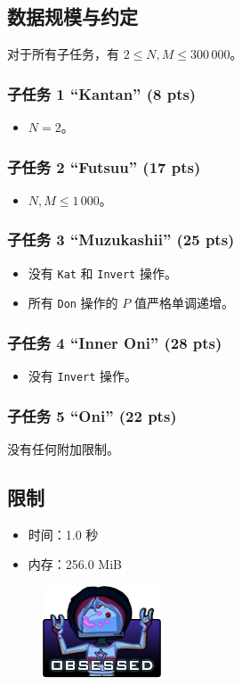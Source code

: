 \documentclass[UTF8, 11pt, a4paper]{article}
\begin{document}
\subsection*{数据规模与约定}
对于所有子任务，有 $2 \leq N, M \leq 300\,000$。
\subsubsection*{子任务 1 “Kantan” (8 pts)}
\begin{itemize}
    \item $N = 2$。
\end{itemize}
\subsubsection*{子任务 2 “Futsuu” (17 pts)}
\begin{itemize}
    \item $N, M \leq 1\,000$。
\end{itemize}
\subsubsection*{子任务 3 “Muzukashii” (25 pts)}
\begin{itemize}
    \item 没有 \texttt{Kat} 和 \texttt{Invert} 操作。
    \item 所有 \texttt{Don} 操作的 $P$ 值严格单调递增。
\end{itemize}
\subsubsection*{子任务 4 “Inner Oni” (28 pts)}
\begin{itemize}
    \item 没有 \texttt{Invert} 操作。
\end{itemize}
\subsubsection*{子任务 5 “Oni” (22 pts)}
    没有任何附加限制。

\subsection*{限制}
\begin{itemize}
\item 时间：1.0 秒
\item 内存：256.0 MiB
\end{itemize}

\begin{figure}[h]\centering
\includegraphics[scale=0.55]{obsessed.png}
\end{figure}
\end{document}
